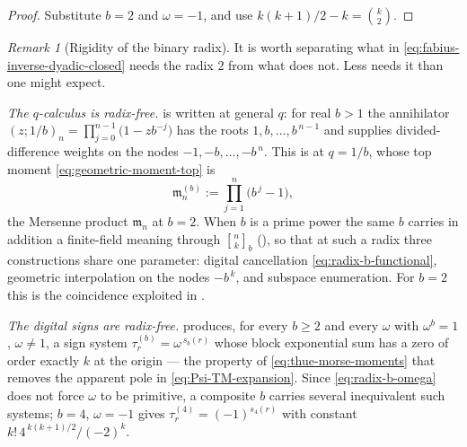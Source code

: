 \documentclass[11pt,oneside,openany]{book}
\theoremstyle{definition}
\theoremstyle{remark}
\newtheorem{remark}[remark]{Remark}
\newcommand{\Qbinom}[3]{\genfrac{[}{]}{0pt}{}{#1}{#2}_{#3}}
\newcommand{\defeq}{\mathrel{:=}}
\begin{document}
\begin{proof}
Substitute $b=2$ and $\omega=-1$, and use $k(k+1)/2-k=\binom k2$.
\end{proof}

\begin{remark}[Rigidity of the binary radix]\label{rem:binary-radix-rigidity}%
\label{rem:radix-prime-power}
It is worth separating what in \eqref{eq:fabius-inverse-dyadic-closed} needs the radix $2$ from what does not.  Less needs it than one might expect.

\emph{The $q$-calculus is radix-free.}   is written at general $q$: for real $b>1$ the annihilator $(z;1/b)_n=\prod_{j=0}^{n-1}\bigl(1-zb^{-j}\bigr)$ has the roots $1,b,\ldots,b^{\,n-1}$ and supplies divided-difference weights on the nodes $-1,-b,\ldots,-b^{\,n}$.  This is  at $q=1/b$, whose top moment \eqref{eq:geometric-moment-top} is
\[
 \mathfrak m^{(b)}_n\defeq\prod_{j=1}^{n}\bigl(b^{\,j}-1\bigr),
\]
the Mersenne product $\mathfrak m_n$ at $b=2$.  When $b$ is a prime power the same $b$ carries in addition a finite-field meaning through $\Qbinom nkb$ (), so that at such a radix three constructions share one parameter: digital cancellation \eqref{eq:radix-b-functional}, geometric interpolation on the nodes $-b^{\,k}$, and subspace enumeration.  For $b=2$ this is the coincidence exploited in .

\emph{The digital signs are radix-free.}   produces, for every $b\ge2$ and every $\omega$ with $\omega^b=1$, $\omega\ne1$, a sign system $\tau^{(b)}_r=\omega^{\,s_b(r)}$ whose block exponential sum has a zero of order exactly $k$ at the origin --- the property of \eqref{eq:thue-morse-moments} that removes the apparent pole in \eqref{eq:Psi-TM-expansion}.  Since \eqref{eq:radix-b-omega} does not force $\omega$ to be primitive, a composite $b$ carries several inequivalent such systems; $b=4$, $\omega=-1$ gives $\tau^{(4)}_r=(-1)^{s_4(r)}$ with constant $k!\,4^{\,k(k+1)/2}/(-2)^k$.


\end{remark}
\end{document}
